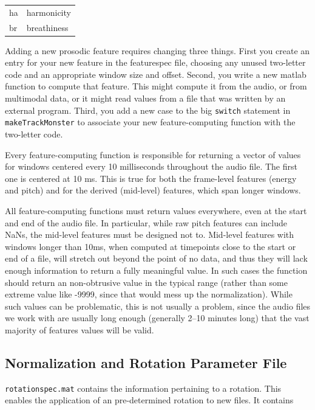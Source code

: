 \documentclass[11pt]{article}
\begin{document}
\begin{tabular}{ll}  
  ha  & harmonicity \\
  br  & breathiness
\end{tabular}

Adding a new prosodic feature requires changing three things.  First
you create an entry for your new feature in the featurespec file,
choosing any unused two-letter code and an appropriate window size and
offset.  Second, you write a new matlab function to compute that
feature.  This might compute it from the audio, or from multimodal
data, or it might read values from a file that was written by an
external program.  Third, you add a new case to the big {\tt switch}
statement in {\tt makeTrackMonster} to associate your new
feature-computing function with the two-letter code.

Every feature-computing function is responsible for returning a vector
of values for windows centered every 10 milliseconds throughout the
audio file.  The first one is centered at 10 ms.  This is true for
both the frame-level features (energy and pitch) and for the derived
(mid-level) features, which span longer windows.  

All feature-computing functions must return values everywhere, even at
the start and end of the audio file.  In particular, while raw pitch
features can include NaNs, the mid-level features must be designed not
to. Mid-level features with windows longer than 10ms, when computed at
timepoints close to the start or end of a file, will stretch out
beyond the point of no data, and thus they will lack enough
information to return a fully meaningful value.  In such cases the
function should return an non-obtrusive value in the typical range
(rather than some extreme value like -9999, since that would mess up
the normalization).  While such values can be problematic, this is not
usually a problem, since the audio files we work with are usually long
enough (generally 2--10 minutes long) that the vast majority of
features values will be valid.


\subsection{Normalization and Rotation Parameter File}

{\tt rotationspec.mat}  contains the information pertaining to a
rotation.  This enables the application of an pre-determined rotation 
to new files.  It contains 
\end{document}
